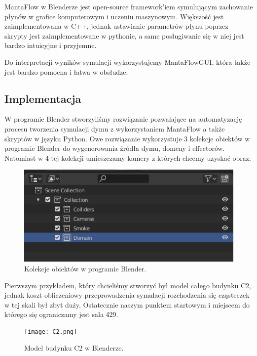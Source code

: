 \documentclass{article}
\begin{document}
            \medskip
            \noindent MantaFlow w Blenderze jest open-source framework'iem symulującym zachowanie płynów w grafice komputerowym i uczeniu maszynowym. Większość jest zaimplementowana w C++, jednak ustawianie parametrów płynu poprzez skrypty jest zaimplementowane w pythonie, a same posługiwanie się w niej jest bardzo intuicyjne i przyjemne. 
            
            \medskip
            \noindent Do interpretacji wyników symulacji wykorzystujemy MantaFlowGUI, która także jest bardzo pomocna i łatwa w obsłudze.
            
          
        \subsection{Implementacja}
            W programie Blender stworzyliśmy rozwiązanie pozwalające na automatyzację procesu tworzenia symulacji dymu z wykorzystaniem MantaFlow a także skryptów w języku Python. Owe rozwiązanie wykorzystuje 3 kolekcje obiektów w programie Blender do wygenerowania źródła dymu, domeny i effectorów. Natomiast w 4-tej kolekcji umieszczamy kamery z których chcemy uzyskać obraz. 
            
            \begin{figure}[h]
                \centering
                \includegraphics[scale = 0.7]{s1.png}
                \caption{Kolekcje obiektów w programie Blender.}
            \end{figure}
            
            \noindent Pierwszym przykładem, który chcieliśmy stworzyć był model całego budynku C2, jednak koszt obliczeniowy przeprowadzenia symulacji rozchodzenia się cząsteczek w tej skali był zbyt duży. Ostatecznie naszym punktem startowym i miejscem do którego się ograniczamy jest sala 429. 
            
            \begin{figure}[h]
                \centering
                \texttt{[image: C2.png]}
                \caption{Model budynku C2 w Blenderze.}
            \end{figure}
            
\end{document}
